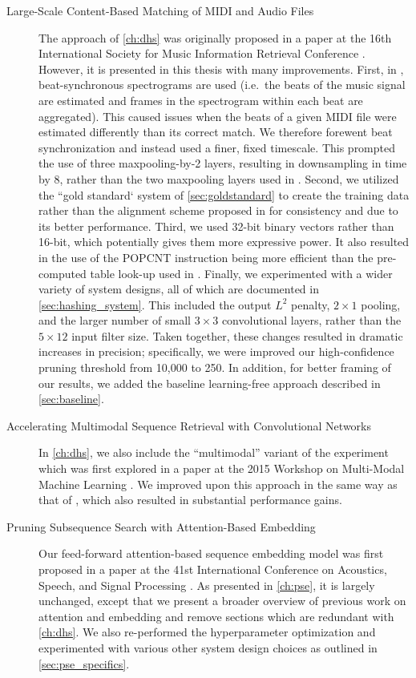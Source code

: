 \begin{description}
\item[Large-Scale Content-Based Matching of MIDI and Audio Files]$\;$\\ The approach of \cref{ch:dhs} was originally proposed in a paper at the 16th International Society for Music Information Retrieval Conference \cite{raffel2015large}.
However, it is presented in this thesis with many improvements.
First, in \cite{raffel2015large}, beat-synchronous spectrograms are used (i.e.\ the beats of the music signal are estimated and frames in the spectrogram within each beat are aggregated).
This caused issues when the beats of a given MIDI file were estimated differently than its correct match.
We therefore forewent beat synchronization and instead used a finer, fixed timescale.
This prompted the use of three maxpooling-by-2 layers, resulting in downsampling in time by 8, rather than the two maxpooling layers used in \cite{raffel2015large}.
Second, we utilized the ``gold standard` system of \cref{sec:goldstandard} to create the training data rather than the alignment scheme proposed in \cite{raffel2015large} for consistency and due to its better performance.
Third, we used 32-bit binary vectors rather than 16-bit, which potentially gives them more expressive power.
It also resulted in the use of the POPCNT instruction being more efficient than the pre-computed table look-up used in \cite{raffel2015large}.
Finally, we experimented with a wider variety of system designs, all of which are documented in \cref{sec:hashing_system}.
This included the output $L^2$ penalty, $2 \times 1$ pooling, and the larger number of small $3 \times 3$ convolutional layers, rather than the $5 \times 12$ input filter size.
Taken together, these changes resulted in dramatic increases in precision; specifically, we were improved our high-confidence pruning threshold from 10,000 to 250.
In addition, for better framing of our results, we added the baseline learning-free approach described in \cref{sec:baseline}.

\item[Accelerating Multimodal Sequence Retrieval with Convolutional Networks]$\;$\\ In \cref{ch:dhs}, we also include the ``multimodal'' variant of the experiment which was first explored in a paper at the 2015 Workshop on Multi-Modal Machine Learning \cite{raffel2015accelerating}.
We improved upon this approach in the same way as that of \cite{raffel2015large}, which also resulted in substantial performance gains.

\item[Pruning Subsequence Search with Attention-Based Embedding]$\;$\\ Our feed-forward attention-based sequence embedding model was first proposed in a paper at the 41st International Conference on Acoustics, Speech, and Signal Processing \cite{raffel2016pruning}.
As presented in \cref{ch:pse}, it is largely unchanged, except that we present a broader overview of previous work on attention and embedding and remove sections which are redundant with \cref{ch:dhs}.
We also re-performed the hyperparameter optimization and experimented with various other system design choices as outlined in \cref{sec:pse_specifics}.
\end{description}
